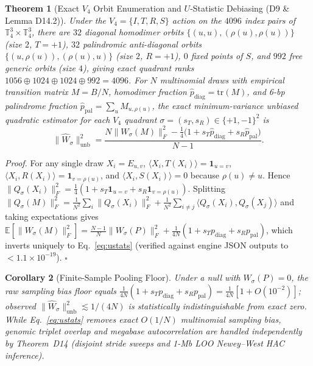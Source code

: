 \documentclass[11pt,a4paper]{article}
\newtheorem{theorem}{Theorem}
\newtheorem{corollary}[theorem]{Corollary}
\newcommand{\Ttorus}{\mathbb{T}_4^3}
\begin{document}
\begin{theorem}[Exact $V_4$ Orbit Enumeration and $U$-Statistic Debiasing (D9 \& Lemma D14.2)]
\label{thm:orbit_debias}
Under the $V_4=\{I,T,R,S\}$ action on the $4096$ index pairs of $\Ttorus\times\Ttorus$, there are $32$ diagonal homodimer orbits $\{(u,u),(\rho(u),\rho(u))\}$ (size $2$, $T=+1$), $32$ palindromic anti-diagonal orbits $\{(u,\rho(u)),(\rho(u),u)\}$ (size $2$, $R=+1$), $0$ fixed points of $S$, and $992$ free generic orbits (size $4$), giving exact quadrant ranks $1056 \oplus 1024 \oplus 1024 \oplus 992 = 4096$. For $N$ multinomial draws with empirical transition matrix $M=B/N$, homodimer fraction $\hat{p}_{\mathrm{diag}}=\mathrm{tr}(M)$, and 6-bp palindrome fraction $\hat{p}_{\mathrm{pal}}=\sum_u M_{u,\rho(u)}$, the exact minimum-variance unbiased quadratic estimator for each $V_4$ quadrant $\sigma=(s_T,s_R)\in\{+1,-1\}^2$ is
\begin{equation}
  \|\widehat{W}_{\sigma}\|^2_{\mathrm{unb}}
  = \frac{N\|W_{\sigma}(M)\|_F^2 - \frac{1}{4}\bigl(1 + s_T \hat{p}_{\mathrm{diag}} + s_R \hat{p}_{\mathrm{pal}}\bigr)}{N - 1}.
  \label{eq:ustats}
\end{equation}
\end{theorem}
\noindent\textit{Proof.} For any single draw $X_i = E_{u,v}$, $\langle X_i, T(X_i)\rangle = \mathbf{1}_{u=v}$, $\langle X_i, R(X_i)\rangle = \mathbf{1}_{v=\rho(u)}$, and $\langle X_i, S(X_i)\rangle = 0$ because $\rho(u)\neq u$. Hence $\|Q_\sigma(X_i)\|_F^2 = \frac{1}{4}(1+s_T\mathbf{1}_{u=v}+s_R\mathbf{1}_{v=\rho(u)})$. Splitting $\|Q_\sigma(M)\|_F^2 = \frac{1}{N^2}\sum_i \|Q_\sigma(X_i)\|_F^2 + \frac{1}{N^2}\sum_{i\neq j}\langle Q_\sigma(X_i), Q_\sigma(X_j)\rangle$ and taking expectations gives $\mathbb{E}[\|W_\sigma(M)\|_F^2] = \frac{N-1}{N}\|W_\sigma(P)\|_F^2 + \frac{1}{4N}(1+s_T p_{\mathrm{diag}}+s_R p_{\mathrm{pal}})$, which inverts uniquely to Eq.~\eqref{eq:ustats} (verified against engine JSON outputs to $<1.1\times 10^{-19}$). $\square$

\begin{corollary}[Finite-Sample Pooling Floor]
\label{cor:floor}
Under a null with $W_\sigma(P)=0$, the raw sampling bias floor equals $\frac{1}{4N}(1+s_T p_{\mathrm{diag}}+s_R p_{\mathrm{pal}}) = \frac{1}{4N}[1+O(10^{-2})]$; observed $\|\widehat{W}_{\sigma}\|^2_{\mathrm{unb}} \lesssim 1/(4N)$ is statistically indistinguishable from exact zero. While Eq.~\eqref{eq:ustats} removes exact $O(1/N)$ multinomial sampling bias, genomic triplet overlap and megabase autocorrelation are handled independently by Theorem~D14 (disjoint stride sweeps and 1-Mb LOO Newey--West HAC inference).
\end{corollary}
\end{document}

